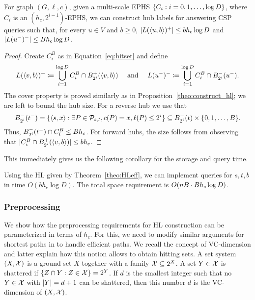 \begin{theorem}
	\label{theo:HLeff}
	For graph $(G,\ell,c)$, given a multi-scale EPHS $\crl*{C_i:i=0,1,\ldots,\log D}$, where $C_i$ is an $(h_c,2^{i-1})$-EPHS, we can construct hub labels for answering CSP queries such that, for every $u\in V$ and $b\geq 0$, $\card{L(\pp{u,b})^+}\leq bh_c\log D$ and $\card{L(u^-)^-}\leq Bh_c\log D$. 
\end{theorem}
\begin{proof}
	Create $C_i^B$ as in Equation~\eqref{eq:hitset} and define
	\[
	L(\pp{v,b})^+ \defeq \bigcup_{i=1}^{\log D} C_i^B\cap \Bf_{2^i}(\pp{v,b}) \quad\text{ and }\quad
	L(u^-)^-  \defeq \bigcup_{i=1}^{\log D} C_i^B\cap \Bb_{2^i}(u^-).
	\]
	The cover property is proved similarly as in Proposition~\ref{theo:construct_hl}; we are left to bound the hub size.
	For a reverse hub we use that
	\[
	\Bb_{2^i}(t^-) = \{\pp{s,x}: \exists P\in \Pst, c(P)=x, \ell(P)\leq 2^i\}
	\subseteq \Bb_{2^i}(t)\times \{0,1,\ldots,B\}.
	\]
	Thus, $\Bb_{2^i}(t^-)\cap C_i^B\leq Bh_c$.
	For forward hubs, the size follows from observing that $ \card{C_i^B\cap \Bf_{2^i}(\pp{v,b})}\leq bh_c$.
\end{proof}

This immediately gives us the following corollary for the storage and query time.
\begin{corollary}
	Using the HL given by Theorem~\ref{theo:HLeff}, we can implement queries for $s,t,b$ in time $O(b h_c\log D)$.
	The total space requirement is $\Or(nB \cdot Bh_c\log D)$.
\end{corollary}


\subsubsection{Preprocessing}
\label{sec:preproc}

We show how the preprocessing requirements for HL construction can be parameterized in terms of $h_c$. For this, we need to modify similar arguments for shortest paths in \cite{highway2013} to handle efficient paths.
We recall the concept of VC-dimension and latter explain how this notion allows to obtain hitting sets.
A set system $(X,\calX)$ is a ground set $X$ together with a family $\calX\subseteq 2^X$.
A set $Y\in \calX$ is shattered if $\{Z\cap Y:Z\in\calX\}=2^Y$.
If $d$ is the smallest integer such that no $Y\in\calX$ with $\card{Y}=d+1$ can be shattered, then this number $d$ is the VC-dimension of $(X,\calX)$.

